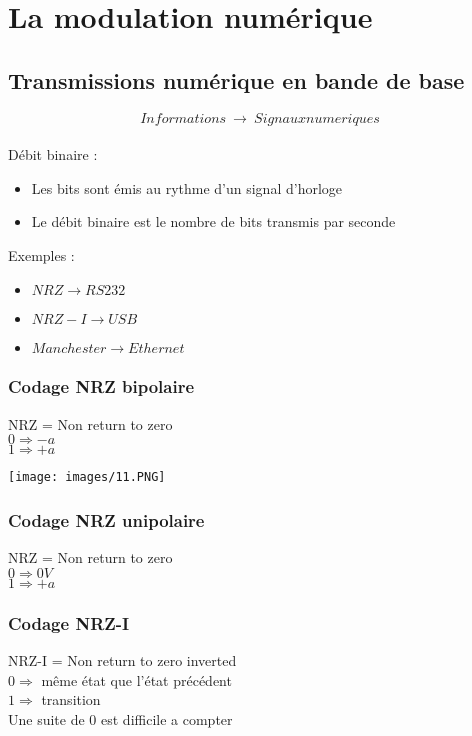 \documentclass[a4paper]{article}
\begin{document}
\section{La modulation numérique}

\subsection{Transmissions numérique en bande de base}
$$Informations\ \rightarrow\ Signaux numeriques$$\\
Débit binaire :
\begin{itemize}
    \item Les bits sont émis au rythme d'un signal d'horloge
    \item Le débit binaire est le nombre de bits transmis par seconde
\end{itemize}

Exemples :
\begin{itemize}
    \item $NRZ \rightarrow RS232$
    \item $NRZ-I \rightarrow USB$
    \item $Manchester \rightarrow Ethernet$
\end{itemize}

\subsubsection{Codage NRZ bipolaire}
NRZ = Non return to zero\\
$0 \Rightarrow -a$\\
$1 \Rightarrow +a$\\

\begin{center}
    \texttt{[image: images/11.PNG]}
\end{center}

\subsubsection{Codage NRZ unipolaire}
NRZ = Non return to zero\\
$0\Rightarrow 0V$\\
$1 \Rightarrow +a$

\subsubsection{Codage NRZ-I}
NRZ-I = Non return to zero inverted\\
$0 \Rightarrow$ même état que l'état précédent\\
$1 \Rightarrow$ transition\\
Une suite de 0 est difficile a compter
\end{document}
